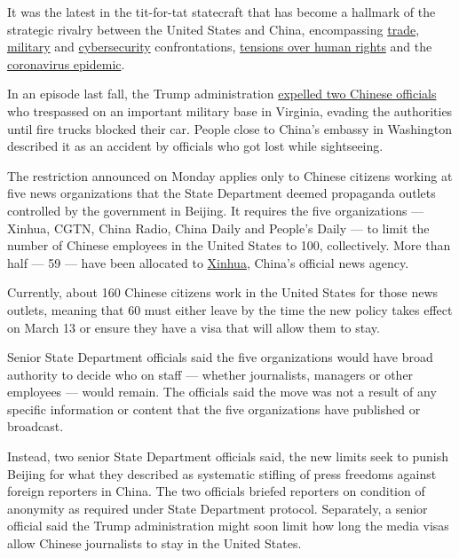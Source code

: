 It was the latest in the tit-for-tat statecraft that has become a
hallmark of the strategic rivalry between the United States and China,
encompassing
\href{https://www.nytimes3xbfgragh.onion/2020/01/15/business/economy/china-trade-deal.html}{trade},
\href{https://www.nytimes3xbfgragh.onion/2020/02/11/world/asia/philippines-united-states-duterte.html}{military}
and
\href{https://www.nytimes3xbfgragh.onion/2020/02/10/us/politics/equifax-hack-china.html}{cybersecurity}
confrontations,
\href{https://www.nytimes3xbfgragh.onion/interactive/2019/11/16/world/asia/china-xinjiang-documents.html}{tensions
over human rights} and the
\href{https://www.nytimes3xbfgragh.onion/2020/02/18/world/asia/china-coronavirus.html}{coronavirus
epidemic}.

In an episode last fall, the Trump administration
\href{https://www.nytimes3xbfgragh.onion/2019/12/15/world/asia/us-china-spies.html}{expelled
two Chinese officials} who trespassed on an important military base in
Virginia, evading the authorities until fire trucks blocked their car.
People close to China's embassy in Washington described it as an
accident by officials who got lost while sightseeing.

The restriction announced on Monday applies only to Chinese citizens
working at five news organizations that the State Department deemed
propaganda outlets controlled by the government in Beijing. It requires
the five organizations --- Xinhua, CGTN, China Radio, China Daily and
People's Daily --- to limit the number of Chinese employees in the
United States to 100, collectively. More than half --- 59 --- have been
allocated to
\href{https://www.facebookcorewwwi.onion/XinhuaNewsAgency/}{Xinhua},
China's official news agency.

Currently, about 160 Chinese citizens work in the United States for
those news outlets, meaning that 60 must either leave by the time the
new policy takes effect on March 13 or ensure they have a visa that will
allow them to stay.

Senior State Department officials said the five organizations would have
broad authority to decide who on staff --- whether journalists, managers
or other employees --- would remain. The officials said the move was not
a result of any specific information or content that the five
organizations have published or broadcast.

Instead, two senior State Department officials said, the new limits seek
to punish Beijing for what they described as systematic stifling of
press freedoms against foreign reporters in China. The two officials
briefed reporters on condition of anonymity as required under State
Department protocol. Separately, a senior official said the Trump
administration might soon limit how long the media visas allow Chinese
journalists to stay in the United States.

